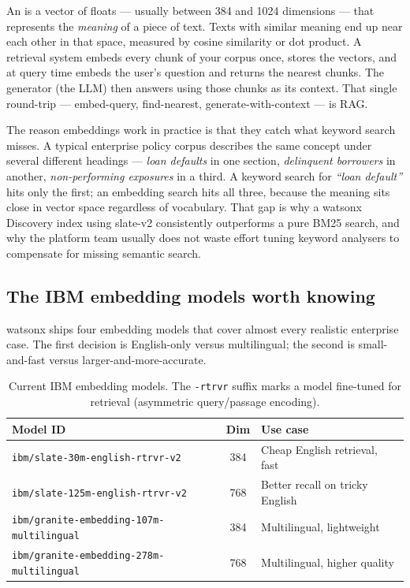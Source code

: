 An  is a vector of floats --- usually between 384 and 1024 dimensions --- that represents the \emph{meaning} of a piece of text. Texts with similar meaning end up near each other in that space, measured by cosine similarity or dot product. A retrieval system embeds every chunk of your corpus once, stores the vectors, and at query time embeds the user's question and returns the nearest chunks. The generator (the LLM) then answers using those chunks as its context. That single round-trip --- embed-query, find-nearest, generate-with-context --- is RAG.

The reason embeddings work in practice is that they catch what keyword search misses. A typical enterprise policy corpus describes the same concept under several different headings --- \emph{loan defaults} in one section, \emph{delinquent borrowers} in another, \emph{non-performing exposures} in a third. A keyword search for \emph{``loan default''} hits only the first; an embedding search hits all three, because the meaning sits close in vector space regardless of vocabulary. That gap is why a watsonx Discovery index using slate-v2 consistently outperforms a pure BM25 search, and why the platform team usually does not waste effort tuning keyword analysers to compensate for missing semantic search.

\subsection{The IBM embedding models worth knowing}

watsonx ships four embedding models that cover almost every realistic enterprise case. The first decision is English-only versus multilingual; the second is small-and-fast versus larger-and-more-accurate.

\begin{table}[h]
\centering
\small
\begin{tabularx}{\textwidth}{l c X}
\toprule
\textbf{Model ID} & \textbf{Dim} & \textbf{Use case} \\
\midrule
\texttt{ibm/slate-30m-english-rtrvr-v2}          & 384 & Cheap English retrieval, fast \\
\texttt{ibm/slate-125m-english-rtrvr-v2}         & 768 & Better recall on tricky English \\
\texttt{ibm/granite-embedding-107m-multilingual} & 384 & Multilingual, lightweight \\
\texttt{ibm/granite-embedding-278m-multilingual} & 768 & Multilingual, higher quality \\
\bottomrule
\end{tabularx}
\caption{Current IBM embedding models. The \texttt{-rtrvr} suffix marks a model fine-tuned for retrieval (asymmetric query/passage encoding).}
\label{tab:ibm-embedders}
\end{table}

